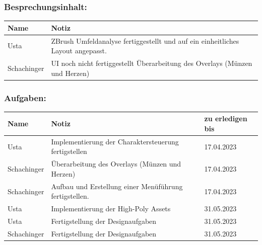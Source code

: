 \subsubsection*{Besprechungsinhalt:}
\begin{tabular}{|m{}|m{}|}
\hline
Name & Notiz \\
\hline
Usta & ZBrush Umfeldanalyse fertiggestellt und auf ein einheitliches Layout angepasst. \\
\hline
Schachinger & UI noch nicht fertiggestellt Überarbeitung des Overlays (Münzen und Herzen) \\
\hline
\end{tabular}

\subsubsection*{Aufgaben:}
\begin{tabular}{|m{}|m{}|m{}|}
\hline
Name & Notiz & zu erledigen bis \\
\hline
Usta & Implementierung der Charaktersteuerung fertigstellen & 17.04.2023 \\
\hline
Schachinger & Überarbeitung des Overlays (Münzen und Herzen) & 17.04.2023 \\
\hline
Schachinger & Aufbau und Erstellung einer Menüführung fertigstellen. & 17.04.2023 \\
\hline
Usta & Implementierung der High-Poly Assets & 31.05.2023 \\
\hline
Usta & Fertigstellung der Designaufgaben & 31.05.2023 \\
\hline
Schachinger & Fertigstellung der Designaufgaben & 31.05.2023 \\
\hline
\end{tabular}


\pagebreak

